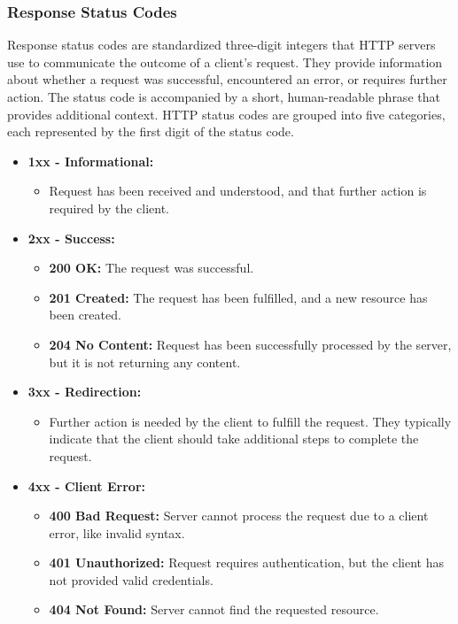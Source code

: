 \newpage
\subsubsection{Response Status Codes}
Response status codes are standardized three-digit integers that HTTP servers use to communicate the outcome of a client's request. They provide information about whether a request was successful, encountered an error, or requires further action. The status code is accompanied by a short, human-readable phrase that provides additional context. HTTP status codes are grouped into five categories, each represented by the first digit of the status code.

\begin{itemize}
    \item \textbf{1xx - Informational:}
    \begin{itemize}
        \item Request has been received and understood, and that further action is required by the client.
    \end{itemize}
    
    \item \textbf{2xx - Success:}
    \begin{itemize}
        \item \textbf{200 OK:} The request was successful.
        \item \textbf{201 Created:} The request has been fulfilled, and a new resource has been created.
        \item \textbf{204 No Content:} Request has been successfully processed by the server, but it is not returning any content.
    \end{itemize}
    
    \item \textbf{3xx - Redirection:}
    \begin{itemize}
        \item Further action is needed by the client to fulfill the request. They typically indicate that the client should take additional steps to complete the request.
    \end{itemize}
    
    \item \textbf{4xx - Client Error:}
    \begin{itemize}
        \item \textbf{400 Bad Request:} Server cannot process the request due to a client error, like invalid syntax.
        \item \textbf{401 Unauthorized:} Request requires authentication, but the client has not provided valid credentials.
        \item \textbf{404 Not Found:} Server cannot find the requested resource.
    \end{itemize}
    

\end{itemize}
